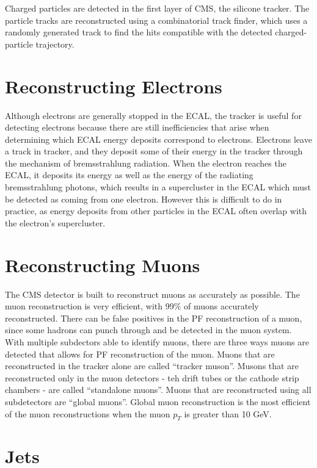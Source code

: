 Charged particles are detected in the first layer of CMS, the silicone tracker. The particle tracks are reconstructed using a combinatorial track finder, which uses a randomly generated track to find the hits compatible with the detected charged-particle trajectory. 


\section{Reconstructing Electrons}

Although electrons are generally stopped in the ECAL, the tracker is useful for detecting electrons because there are still inefficiencies that arise when determining which ECAL energy deposits correspond to electrons. Electrons leave a track in tracker, and they deposit some of their energy in the tracker through the mechanism of bremsstrahlung radiation. When the electron reaches the ECAL, it deposits its energy as well as the energy of the radiating bremsstrahlung photons, which results in a supercluster in the ECAL which must be detected as coming from one electron. However this is difficult to do in practice, as energy deposits from other particles in the ECAL often overlap with the electron’s supercluster.

\section{Reconstructing Muons}

The CMS detector is built to reconstruct muons as accurately as possible. The muon reconstruction is very efficient, with 99\% of muons accurately reconstructed. There can be false positives in the PF reconstruction of a muon, since some hadrons can punch through and be detected in the muon system. With multiple subdectors able to identify muons, there are three ways muons are detected that allows for PF reconstruction of the muon. Muons that are reconstructed in the tracker alone are called “tracker muson”. Musons that are reconstructed only in the muon detectors - teh drift tubes or the cathode strip chambers - are called “standalone muons”. Muons that are reconstructed using all subdetectors are “global muons''. Global muon reconstruction is the most efficient of the muon reconstructions when the muon $p_T$ is greater than 10 GeV.


\section{Jets}

